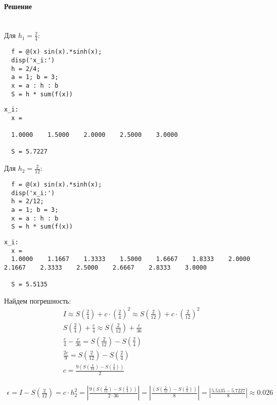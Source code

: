 \paragraph{Решение} ~\\
Для $h_{1}= \frac{2}{4}$:
\begin{lstlisting}
  f = @(x) sin(x).*sinh(x);
  disp('x_i:')
  h = 2/4;
  a = 1; b = 3;
  x = a : h : b
  S = h * sum(f(x))
\end{lstlisting}
\begin{lstlisting}[backgroundcolor=\color{cyan}]
  x_i:
  x =

  1.0000    1.5000    2.0000    2.5000    3.0000

  S = 5.7227
\end{lstlisting}
Для $h_{2} = \frac{2}{12}$:
\begin{lstlisting}
  f = @(x) sin(x).*sinh(x);
  disp('x_i:')
  h = 2/12;
  a = 1; b = 3;
  x = a : h : b
  S = h * sum(f(x))
\end{lstlisting}
\begin{lstlisting}[backgroundcolor=\color{cyan}]
  x_i:
  x =
  1.0000    1.1667    1.3333    1.5000    1.6667    1.8333    2.0000    2.1667    2.3333    2.5000    2.6667    2.8333    3.0000

  S = 5.5135
\end{lstlisting}

Найдем погрешность:
\begin{gather*}
  I \approx S\left(\frac{2}{4}\right) + c \cdot \left(\frac{2}{4}\right)^{2} \approx S\left(\frac{2}{12}\right) + c \cdot \left(\frac{2}{12}\right)^{2}\\[2mm]
  S\left(\frac{2}{4}\right) + \frac{c}{4} \approx S\left(\frac{2}{12}\right) + \frac{c}{36}\\[2mm]
  \frac{c}{4} - \frac{c}{36} = S\left(\frac{2}{12}\right) - S\left(\frac{2}{4}\right)\\[2mm]
  \frac{2c}{9} = S\left(\frac{2}{12}\right) - S\left(\frac{2}{4}\right)\\[2mm]
  c = \frac{9 \left(S\left(\frac{2}{12}\right) - S\left(\frac{2}{4}\right)\right)}{2}
\end{gather*}

\begin{align*}
  \epsilon = I - S\left(\frac{2}{12}\right) = c \cdot h_{2}^{2} = \left| \frac{9 \left(S\left(\frac{2}{12}\right) - S\left(\frac{2}{4}\right)\right)}{2 \cdot 36} \right| = \left| \frac{\left(S\left(\frac{2}{12}\right) - S\left(\frac{2}{4}\right)\right)}{8} \right| = \left|\frac{5.5135 - 5.7227}{8} \right| \approx 0.026
\end{align*}
